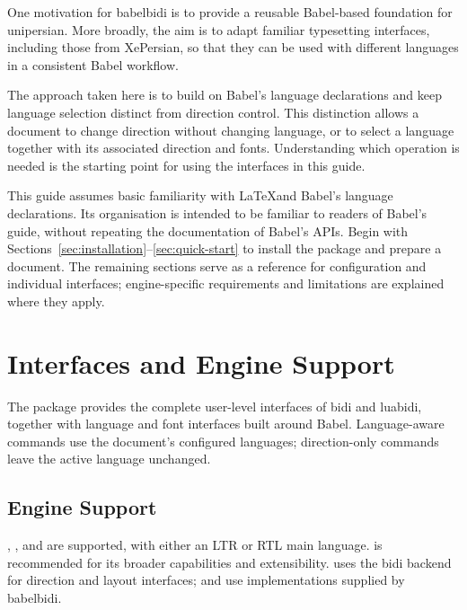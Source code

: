 \documentclass{ltxdoc}
\begin{document}
    One motivation for \textsf{babelbidi} is to provide a reusable
    Babel-based foundation for \textsf{unipersian}. More broadly, the
    aim is to adapt familiar typesetting interfaces, including those
    from \textsf{XePersian}, so that they can be used with different
    languages in a consistent Babel workflow.

    The approach taken here is to build on Babel's language declarations
    and keep language selection distinct from direction control.
    This distinction allows a document to change direction without
    changing language, or to select a language together with its
    associated direction and fonts. Understanding which operation is
    needed is the starting point for using the interfaces in this guide.

    This guide assumes basic familiarity with \LaTeX and Babel's
    language declarations. Its organisation is intended to be familiar
    to readers of Babel's guide, without repeating the documentation of
    Babel's APIs. Begin with Sections~\ref{sec:installation}--\ref{sec:quick-start}
    to install the package and prepare a document. The remaining
    sections serve as a reference for configuration and individual
    interfaces; engine-specific requirements and limitations are
    explained where they apply.


    \section{Interfaces and Engine Support}
    \label{sec:interfaces-engine-support}

    The package provides the complete user-level interfaces of
    \textsf{bidi} and \textsf{luabidi}, together with language and font
    interfaces built around Babel. Language-aware commands use the
    document's configured languages; direction-only commands leave
    the active language unchanged.

    \subsection{Engine Support}
    \label{sec:engine-support}

    \LuaLaTeX, \XeLaTeX, and \pdfLaTeX are supported, with either an
    LTR or RTL main language. \LuaLaTeX is recommended for its broader
    capabilities and extensibility. \XeTeX uses the \textsf{bidi}
    backend for direction and layout interfaces; \LuaTeX and \pdfTeX
    use implementations supplied by \textsf{babelbidi}.
\end{document}
